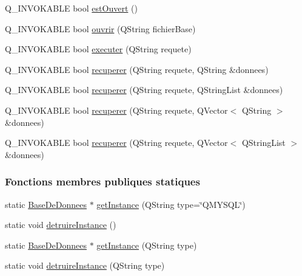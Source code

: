 \begin{DoxyCompactItemize}
\item 
Q\+\_\+\+I\+N\+V\+O\+K\+A\+B\+LE bool \hyperlink{class_base_de_donnees_a4775c12990ad9aa04436cca39d38ea87}{est\+Ouvert} ()
\item 
Q\+\_\+\+I\+N\+V\+O\+K\+A\+B\+LE bool \hyperlink{class_base_de_donnees_ac78463462de62ddc5c3275baa5b0b1a5}{ouvrir} (Q\+String fichier\+Base)
\item 
Q\+\_\+\+I\+N\+V\+O\+K\+A\+B\+LE bool \hyperlink{class_base_de_donnees_a100c7d77b4140ca726657c418323d836}{executer} (Q\+String requete)
\item 
Q\+\_\+\+I\+N\+V\+O\+K\+A\+B\+LE bool \hyperlink{class_base_de_donnees_a308f34d9c6de5ba57d23a948ab36f508}{recuperer} (Q\+String requete, Q\+String \&donnees)
\item 
Q\+\_\+\+I\+N\+V\+O\+K\+A\+B\+LE bool \hyperlink{class_base_de_donnees_a7b7de60515b670572c937f922b5d6887}{recuperer} (Q\+String requete, Q\+String\+List \&donnees)
\item 
Q\+\_\+\+I\+N\+V\+O\+K\+A\+B\+LE bool \hyperlink{class_base_de_donnees_a2d629c2816246410a15762c487c55a05}{recuperer} (Q\+String requete, Q\+Vector$<$ Q\+String $>$ \&donnees)
\item 
Q\+\_\+\+I\+N\+V\+O\+K\+A\+B\+LE bool \hyperlink{class_base_de_donnees_aa8c509bc3270154b8804765b61d5467d}{recuperer} (Q\+String requete, Q\+Vector$<$ Q\+String\+List $>$ \&donnees)
\end{DoxyCompactItemize}
\subsubsection*{Fonctions membres publiques statiques}
\begin{DoxyCompactItemize}
\item 
static \hyperlink{class_base_de_donnees}{Base\+De\+Donnees} $\ast$ \hyperlink{class_base_de_donnees_a80028aa2b6b4fbf30fb2e36357b7d3d3}{get\+Instance} (Q\+String type=\char`\"{}Q\+M\+Y\+S\+QL\char`\"{})
\item 
static void \hyperlink{class_base_de_donnees_a457401c0816b888c77ce915997545f4e}{detruire\+Instance} ()
\item 
static \hyperlink{class_base_de_donnees}{Base\+De\+Donnees} $\ast$ \hyperlink{class_base_de_donnees_a55298012e86b8b56dc5c7ecd2fd49ffa}{get\+Instance} (Q\+String type)
\item 
static void \hyperlink{class_base_de_donnees_a5002dc7324ab6f82c607e2423709b806}{detruire\+Instance} (Q\+String type)
\end{DoxyCompactItemize}

